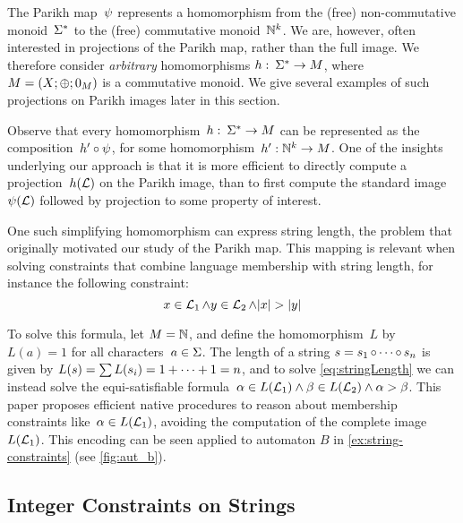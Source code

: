 The Parikh map~$\operatorname{\psi}$ represents a homomorphism from the (free)
non-commutative monoid~$\Sigma^*$ to the (free) commutative
monoid~$\mathbb{N}^k$. We are, however, often interested in projections of the
Parikh map, rather than the full image. We therefore consider \emph{arbitrary}
homomorphisms $h:\: \Sigma^* \to M$, where $M =
\left(X;\operatorname{\oplus};0_{M}\right)$ is a commutative monoid. We give several
examples of such projections on Parikh images later in this section.

Observe that every homomorphism~$h:\: \Sigma^* \to M$ can be
represented as the composition~$h' \circ \operatorname{\psi}$, for some
homomorphism~$h' : \mathbb{N}^k \to M$. One of the insights underlying our
approach is that it is more efficient to directly compute a
projection~$h(\operatorname{\mathcal{L}})$ on the Parikh image, than to first compute the
standard image~$\operatorname{\psi}(\operatorname{\mathcal{L}})$ followed by projection to
some property of interest.


\begin{example}\label{ex:length}
One such simplifying homomorphism can express string
length, the problem that originally motivated our study of the Parikh
map. This mapping is relevant when solving constraints that combine
language membership with string length, for instance the following constraint:
\begin{equation}\label{eq:stringLength}
x \in \operatorname{\mathcal{L}}_1 \wedge y \in \operatorname{\mathcal{L}}_2 \wedge |x| > |y|
\end{equation}

To solve this formula, let
$M = \mathbb{N}$, and define the homomorphism~$L$ by $L(a) = 1$
for all characters~$a \in \Sigma$. The length of a string
$s = s_1 \operatorname{\circ} \cdots \operatorname{\circ} s_n$ is given by
$L(s) = \sum L(s_i) = 1 + \cdots + 1 = n$, and to solve
\eqref{eq:stringLength} we can instead solve the equi-satisfiable
formula~$\alpha \in L(\operatorname{\mathcal{L}}_1) \wedge \beta \in L(\operatorname{\mathcal{L}}_2)
\wedge \alpha > \beta$. This paper proposes efficient native
procedures to reason about membership constraints
like~$\alpha \in L(\operatorname{\mathcal{L}}_1)$, avoiding the computation of
the complete image~$L(\operatorname{\mathcal{L}}_1)$. This encoding can be seen applied to automaton $B$ in
\cref{ex:string-constraints} (see \cref{fig:aut_b}).
\end{example}

\subsection{Integer Constraints on Strings}\label{sec:parikh-automata}

